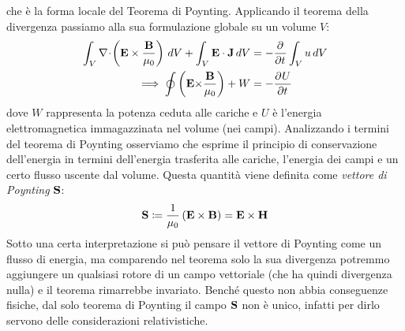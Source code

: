 che è la forma locale del Teorema di Poynting. Applicando il teorema della divergenza passiamo alla sua formulazione globale su un volume $ V $:
\begin{align}
  \int_V \nabla \! \cdot \!\left( \mathbf{ E } \times \frac{\mathbf{ B }}{\mu_0}  \right) \, dV + \int_V \mathbf{ E \cdot J } \,dV &=  -\frac{\partial^{} {}}{\partial {t}^{}} \int_V u \,dV
  \\
  \implies \oint \left( \mathbf{ E \times } \frac{\mathbf{ B }}{\mu_0} \right) + W &= - \frac{\partial^{} {U}}{\partial {t}^{}}
\end{align}
dove $ W $ rappresenta la potenza ceduta alle cariche e $ U $ è l'energia elettromagnetica immagazzinata nel volume (nei campi). Analizzando i termini 
del teorema di Poynting osserviamo che esprime il principio di conservazione dell'energia in termini dell'energia trasferita alle cariche, l'energia dei 
campi e un certo flusso uscente dal volume. Questa quantità viene definita come \textit{vettore di Poynting} $ \mathbf{ S } $:
\begin{align}
  \mathbf{ S } \coloneqq \frac{1}{\mu_0} \left(  \mathbf{ E \times B } \right) = \mathbf{ E \times H }
\end{align}
Sotto una certa interpretazione si può pensare il vettore di Poynting come un flusso di energia, ma comparendo nel teorema solo la sua divergenza potremmo 
aggiungere un qualsiasi rotore di un campo vettoriale (che ha quindi divergenza nulla) e il teorema rimarrebbe invariato. Benché questo non abbia conseguenze 
fisiche, dal solo teorema di Poynting il campo $ \mathbf{ S } $ non è unico, infatti per dirlo servono delle considerazioni relativistiche.

